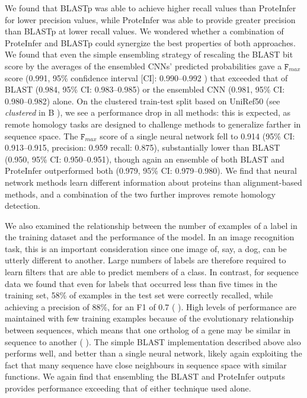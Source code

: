 We found that BLASTp was able to achieve higher recall values than ProteInfer for lower precision values, while ProteInfer was able to provide greater precision than BLASTp at lower recall values. We wondered whether a combination of ProteInfer and BLASTp could synergize the best properties of both approaches. We found that even the simple ensembling strategy of rescaling the BLAST bit score by the averages of the ensembled CNNs' predicted probabilities gave a $\texttt{F}_{max}$ score (0.991, 95\% confidence interval [CI]: 0.990--0.992 ) that exceeded that of BLAST (0.984, 95\% CI: 0.983--0.985) or the ensembled CNN (0.981, 95\% CI: 0.980--0.982) alone. 
On the clustered train-test split based on UniRef50 (see \textit{clustered} in B%
), we see a performance drop in all methods: this is expected, as remote homology tasks are designed to challenge methods to generalize farther in sequence space. The $\texttt{F}_{max}$ score of a single neural network fell to 0.914 (95\% CI: 0.913--0.915, precision: 0.959 recall: 0.875), substantially lower than BLAST (0.950, 95\% CI: 0.950--0.951), though again an ensemble of both BLAST and ProteInfer outperformed both (0.979, 95\% CI: 0.979--0.980). We find that neural network methods learn different information about proteins than alignment-based methods, and a combination of the two further improves remote homology detection. 

We also examined the relationship between the number of examples of a label in the training dataset and the performance of the model. In an image recognition task, this is an important consideration since one image of, say, a dog, can be utterly different to another. Large numbers of labels are therefore required to learn filters that are able to predict members of a class. In contrast, for sequence data we found that even for labels that occurred less than five times in the training set, 58\% of examples in the test set were correctly recalled, while achieving a precision of 88\%, for an F1 of 0.7 (%
). High levels of performance are maintained with few training examples because of the evolutionary relationship between sequences, which means that one ortholog of a gene may be similar in sequence to another (%
). The simple BLAST implementation described above also performs well, and better than a single neural network, likely again exploiting the fact that many sequence have close neighbours in sequence space with similar functions. We again find that ensembling the BLAST and ProteInfer outputs provides performance exceeding that of either technique used alone.
